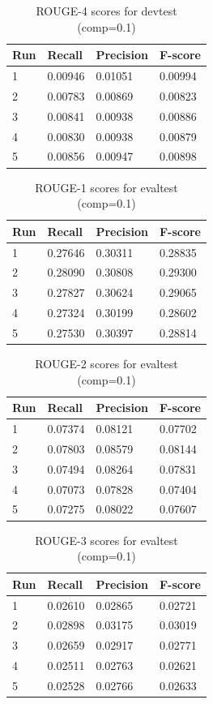 \documentclass[11pt]{article}
\begin{document}
\begin{table}[!ht]
\centering
\caption*{ROUGE-4 scores for devtest (comp=0.1)}
\begin{tabular}{|l|l|l|l|}
\hline
Run   & Recall  & Precision & F-score \\ \hline
1 & 0.00946 & 0.01051   & 0.00994 \\ \hline
2 & 0.00783 & 0.00869   & 0.00823 \\ \hline
3 & 0.00841 & 0.00938   & 0.00886 \\ \hline
4 & 0.00830 & 0.00938   & 0.00879 \\ \hline
5 & 0.00856 & 0.00947   & 0.00898 \\ \hline
\end{tabular}
\end{table}

\begin{table}[!ht]
\centering
\caption*{ROUGE-1 scores for evaltest (comp=0.1)}
\begin{tabular}{|l|l|l|l|}
\hline
Run   & Recall  & Precision & F-score \\ \hline
1 & 0.27646 & 0.30311   & 0.28835 \\ \hline
2 & 0.28090 & 0.30808   & 0.29300 \\ \hline
3 & 0.27827 & 0.30624   & 0.29065 \\ \hline
4 & 0.27324 & 0.30199   & 0.28602 \\ \hline
5 & 0.27530 & 0.30397   & 0.28814 \\ \hline
\end{tabular}
\end{table}

\begin{table}[!ht]
\centering
\caption*{ROUGE-2 scores for evaltest (comp=0.1)}
\begin{tabular}{|l|l|l|l|}
\hline
Run   & Recall  & Precision & F-score \\ \hline
1 & 0.07374 & 0.08121   & 0.07702 \\ \hline
2 & 0.07803 & 0.08579   & 0.08144 \\ \hline
3 & 0.07494 & 0.08264   & 0.07831 \\ \hline
4 & 0.07073 & 0.07828   & 0.07404 \\ \hline
5 & 0.07275 & 0.08022   & 0.07607 \\ \hline
\end{tabular}
\end{table}

\begin{table}[!ht]
\centering
\caption*{ROUGE-3 scores for evaltest (comp=0.1)}
\begin{tabular}{|l|l|l|l|}
\hline
Run   & Recall  & Precision & F-score \\ \hline
1 & 0.02610 & 0.02865   & 0.02721 \\ \hline
2 & 0.02898 & 0.03175   & 0.03019 \\ \hline
3 & 0.02659 & 0.02917   & 0.02771 \\ \hline
4 & 0.02511 & 0.02763   & 0.02621 \\ \hline
5 & 0.02528 & 0.02766   & 0.02633 \\ \hline
\end{tabular}
\end{table}
\end{document}

